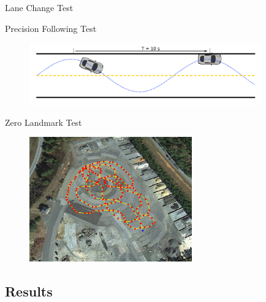 \documentclass{beamer}
\begin{document}
    \begin{frame}{Lane Change Test}
      \begin{figure}
        
      \end{figure}
    \end{frame}

    \begin{frame}{Precision Following Test}
      \begin{figure}
        \includegraphics[width=10cm]{../graphics/precision_following_diagram.png}
      \end{figure}   
    \end{frame}

    \begin{frame}{Zero Landmark Test}
      \begin{figure}
        \includegraphics[width=7cm]{../graphics/zero_landmark_path.png}
      \end{figure}
    \end{frame}


  \subsection{Results}
\end{document}
